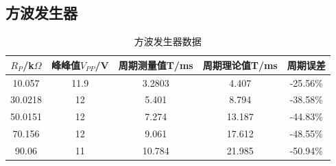 \documentclass[a4paper]{article}
\begin{document}
\subsection{方波发生器}%
\begin{table}[!h]
\centering
\caption{方波发生器数据}
\label{data1}
\begin{tabular}{|c|c|c|c|c|}
\hline
$R_P$/k$\Omega$ & 峰峰值$V_{PP}$/V & 周期测量值T/ms & 周期理论值T/ms & 周期误差 \\ \hline
10.057          & 11.9          & 3.2803    & 4.407     & -25.56\%  \\ \hline
30.0218         & 12            & 5.401     & 8.794     & -38.58\%  \\ \hline
50.0151         & 12            & 7.274     & 13.187    & -44.83\%  \\ \hline
70.156          & 12            & 9.061     & 17.612    & -48.55\%  \\ \hline
90.06           & 11            & 10.784    & 21.985    & -50.94\%  \\ \hline
\end{tabular}
\end{table}
\end{document}
